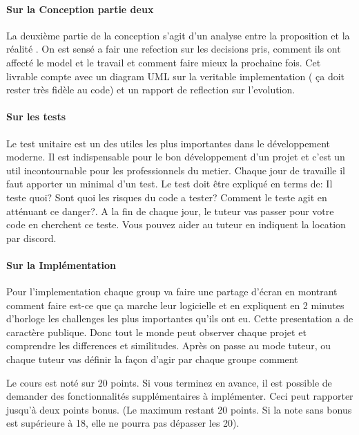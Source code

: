 \documentclass[12pt]{article}
\begin{document}
	\paragraph{Sur la Conception partie deux }
		La deuxième partie de la conception s'agit d'un analyse entre la proposition et la réalité . 
		On est sensé a fair une refection sur les decisions pris, comment ils ont affecté le model et le travail et comment faire mieux la prochaine fois. 
		Cet livrable compte avec un diagram UML sur la veritable implementation ( ça doit rester très fidèle au code) et un rapport de reflection sur l'evolution. 
	
	\paragraph{Sur les tests}
		Le test unitaire est un des utiles les plus importantes dans le développement moderne. Il est indispensable pour le bon développement d'un projet et c'est un util incontournable pour les professionnels du metier.
		Chaque jour de travaille il faut apporter un minimal d'un test.  
		Le test doit être expliqué en terms de: Il teste quoi? Sont quoi les risques du code a tester? Comment le teste agit en atténuant ce danger?.
		A la fin de chaque jour, le tuteur vas passer pour votre code en cherchent ce teste. Vous pouvez aider au tuteur en indiquent la location par discord. 
		
	\paragraph{Sur la Implémentation}
		Pour l'implementation chaque group va faire une partage d'écran en montrant comment faire est-ce que ça marche leur logicielle et en expliquent en 2 minutes d'horloge les challenges les plus importantes qu'ils ont eu. 
		Cette presentation a de caractère publique. Donc tout le monde peut observer chaque projet et comprendre les differences et similitudes. 
		Après on passe au mode tuteur, ou chaque tuteur vas définir la façon d'agir par chaque groupe comment 
			
	
	Le cours est noté sur 20 points. 
	Si vous terminez en avance, il est possible de demander des fonctionnalités supplémentaires à implémenter. Ceci peut rapporter jusqu'à deux points bonus. (Le maximum restant 20 points. Si la note sans bonus est supérieure à 18, elle ne pourra pas dépasser les 20).
	
\end{document}

